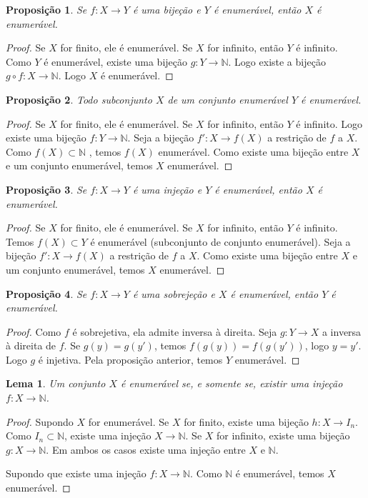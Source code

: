 \documentclass{article}
\newtheorem{prop}{Proposição}[section]
\theoremstyle{theorem}
\theoremstyle{lemma}
\newtheorem{lema}{Lema}
\theoremstyle{definition}
\theoremstyle{remark}
\begin{document}
\begin{prop}
	Se $f:X\to Y$ é uma bijeção e $Y$ é enumerável, então $X$ é enumerável.
\end{prop}
\begin{proof}
	Se $X$ for finito, ele é enumerável. Se $X$ for infinito,  então $Y$ é infinito.  Como $Y$ é enumerável,  existe uma bijeção $g: Y \to \mathbb{N}$. Logo existe a bijeção $g\circ f: X \to \mathbb{N}$. Logo $X$ é enumerável.
\end{proof}
\begin{prop}
	Todo subconjunto $X$ de um conjunto enumerável $Y$ é enumerável.
\end{prop}
\begin{proof}
	Se $X$ for finito, ele é enumerável. Se $X$ for infinito,  então $Y$ é infinito. Logo existe uma bijeção $f: Y \to \mathbb{N}$. Seja  a bijeção $f':X\to f(X)$ a restrição de $f$ a $X$. Como $f(X)\subset \mathbb{N}$ , temos $f(X)$ enumerável. Como existe uma bijeção entre $X$ e um conjunto enumerável, temos $X$  enumerável.
\end{proof}
\begin{prop}
	Se $f:X\to Y$ é uma injeção e $Y$ é enumerável, então $X$ é enumerável.
\end{prop}
\begin{proof}
	Se $X$ for finito, ele é enumerável. Se $X$ for infinito,  então $Y$ é infinito. Temos $f(X) \subset Y$ é enumerável (subconjunto de conjunto enumerável). Seja  a bijeção $f':X\to f(X)$ a restrição de $f$ a $X$. Como existe uma bijeção entre $X$ e um conjunto enumerável, temos $X$ enumerável.
\end{proof}
\begin{prop}
	Se $f:X\to Y$ é uma sobrejeção e $X$ é enumerável, então $Y$ é enumerável.
\end{prop}
\begin{proof}
	Como $f$ é sobrejetiva, ela admite inversa à direita. Seja $g: Y\to X$ a inversa à direita de $f$.  Se $g(y) = g(y')$, temos $f(g(y)) = f(g(y'))$, logo $y = y'$. Logo $g$ é injetiva. Pela proposição anterior, temos $Y$ enumerável. 
\end{proof}
\begin{lema}
	Um conjunto $X$ é enumerável se, e somente se, existir uma injeção $f: X \to \mathbb{N}$.
\end{lema}
\begin{proof}
	Supondo $X$ for enumerável. Se $X$ for finito, existe uma bijeção $h: X \to I_n$. Como $I_n \subset \mathbb{N}$,  existe uma injeção $X\to \mathbb{N}$. Se $X$ for infinito, existe uma bijeção $g: X \to \mathbb{N}$. Em ambos os casos existe uma injeção entre $X$ e $\mathbb{N}$.

	Supondo que existe uma injeção $f: X \to \mathbb{N}$. Como $\mathbb{N}$ é enumerável, temos $X$ enumerável.
\end{proof}
\end{document}
